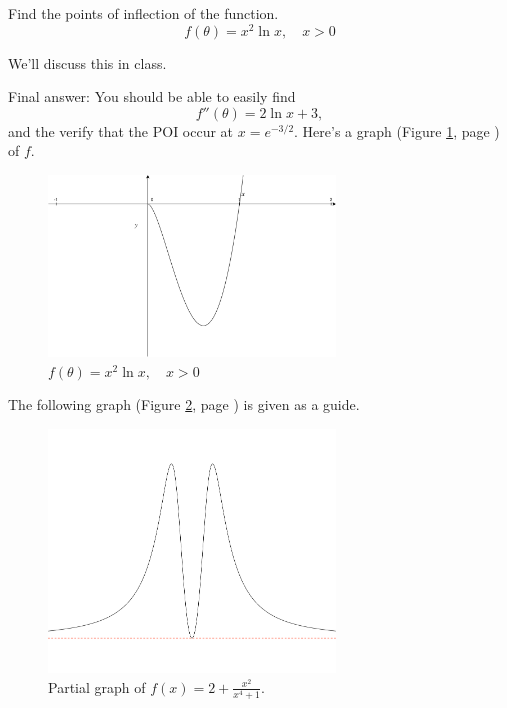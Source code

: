 \documentclass[12pt,addpoints, answers, fleqn]{exam}
\begin{document}
\begin{questions}
\question Find the points of inflection of the function.
\[
f\left( \theta \right) = x^2 \ln x, \quad x>0
\]
\begin{solution}
We'll discuss this in class.

Final answer: You should be able to easily find
\[
f''\left( \theta \right) = 2 \ln x + 3,
\]
and the verify that the POI occur at $x= e^{-3/2}$. Here's a graph (Figure \ref{fig:graph121040403}, page \pageref{fig:graph121040403})  of $f$.
\end{solution}
\begin{figure}[htbp] %
   \centering
   \includegraphics[width=3in]{./graphics/graph121040403.pdf} 
   \caption{$\displaystyle f\left( \theta \right) = x^2 \ln x, \quad x>0$}
   \label{fig:graph121040403}
\end{figure}









\question The following graph (Figure \ref{fig:graph2114}, page \pageref{fig:graph2114}) is given as a guide.

\begin{figure}[htbp] %
   \centering
   \includegraphics[width=3in]{./graphics/graph2114.pdf} 
   \caption{Partial graph of $\displaystyle f \left( x \right) = 2 + \frac{x^2}{x^4 + 1}$.}
   \label{fig:graph2114}
\end{figure}


\end{questions}
\end{document}
